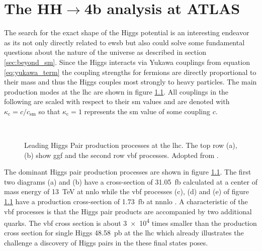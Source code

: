\chapter{The HH$\rightarrow$4b analysis at ATLAS}

The search for the exact shape of the Higgs potential is an interesting endeavor as its not only  directly related to \ac{ewsb} but also could solve some fundamental questions about the nature of the universe as described in section \ref{sec:beyond_sm}. Since the Higgs interacts via Yukawa couplings from equation \ref{eq:yukawa_term} the coupling strengths for fermions are directly proportional to their mass and thus the Higgs couples most strongly to heavy particles. The main production modes at the \ac{lhc} are shown in figure \ref{fig:main_production_processes}. All couplings in the following are scaled with respect to their \ac{sm} values and are denoted with $\kappa_\mathrm{c} = c/c_\mathrm{sm}$ so that $\kappa_\mathrm{c}=1$ represents the \ac{sm} value of some coupling $c$.

\begin{figure}
    \centering
    \hspace{.06\textwidth}
     \\
    \hspace{.01\textwidth}
    \hspace{.01\textwidth}
    \caption[]{Leading Higgs Pair production processes at the \ac{lhc}. The top row (a), (b) show \ac{ggf} and the second row \ac{vbf} processes. Adopted from \citep{aad2023search}.}
    \label{fig:main_production_processes}
\end{figure}
The dominant Higgs pair production processes are shown in figure \ref{fig:main_production_processes}. The first two diagrams (a) and (b) have a cross-section of
\qty[]{31.05}{fb} calculated at a center of mass energy of \qty[]{13}{TeV} at \ac{nnlo} \citep{Grazzini_2018} while the \ac{vbf} processes (c), (d) and (e) of figure \ref{fig:main_production_processes} have a production cross-section of \qty[]{1.73}{fb} at \ac{nnnlo} \citep{PhysRevD.98.114016}. A characteristic of the \ac{vbf} processes is that the Higgs pair products are accompanied by two additional quarks. The \ac{vbf} cross section is about \qty[]{3e4}{} times smaller than the production cross section for single Higgs \qty[]{48.58}{pb} at the \ac{lhc} \citep{de2016arxiv} which already illustrates the challenge a discovery of Higgs pairs in the these final states poses.

